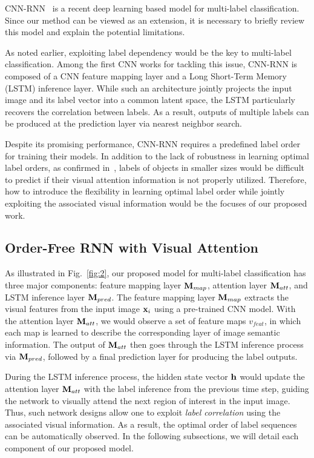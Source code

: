 \documentclass[letterpaper]{article} %
\begin{document}
CNN-RNN~\cite{wang2016cnn} is a recent deep learning based model for multi-label classification. Since our method can be viewed as an extension, it is necessary to briefly review this model and explain the potential limitations.

As noted earlier, exploiting label dependency would be the key to multi-label classification. Among the first CNN works for tackling this issue, CNN-RNN is composed of a CNN feature mapping layer and a Long Short-Term Memory (LSTM) inference layer. While such an architecture jointly projects the input image and its label vector into a common latent space, the LSTM particularly recovers the correlation between labels. As a result, outputs of multiple labels can be produced at the prediction layer via nearest neighbor search.

Despite its promising performance, CNN-RNN requires a predefined label order for training their models. In addition to the lack of robustness in learning optimal label orders, as confirmed in~\cite{wang2016cnn}, labels of objects in smaller sizes would be difficult to predict if their visual attention information is not properly utilized. Therefore, how to introduce the flexibility in learning optimal label order while jointly exploiting the associated visual information would be the focuses of our proposed work.

\subsection{Order-Free RNN with Visual Attention}
As illustrated in Fig.~\ref{fig:2}, our proposed model for multi-label classification has three major components: feature mapping layer $\mathbf{M}_{map}$, attention layer $\mathbf{M}_{att}$, and LSTM inference layer $\mathbf{M}_{pred}$. The feature mapping layer $\mathbf{M}_{map}$ extracts the visual features from the input image $\textbf{x}_i$ using a pre-trained CNN model. With the attention layer $\mathbf{M}_{att}$, we would observe a set of feature maps $v_{feat}$, in which each map is learned to describe the corresponding layer of image semantic information. The output of $\mathbf{M}_{att}$ then goes through the LSTM inference process via $\mathbf{M}_{pred}$, followed by a final prediction layer for producing the label outputs.

During the LSTM inference process, the hidden state vector $\mathbf{h}$ would update the attention layer $\mathbf{M}_{att}$ with the label inference from the previous time step, guiding the network to visually attend the next region of interest in the input image. Thus, such network designs allow one to exploit \emph{label correlation} using the associated visual information. As a result, the optimal order of label sequences can be automatically observed. In the following subsections, we will detail each component of our proposed model.\\
\end{document}
